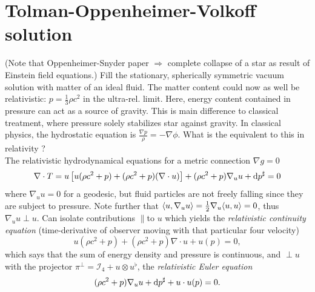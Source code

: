 \section{Tolman-Oppenheimer-Volkoff solution}
(Note that Oppenheimer-Snyder paper $\Rightarrow$ complete collapse of a star as result of Einstein field equations.)
Fill the stationary, spherically symmetric vacuum solution with matter of an ideal fluid. The matter content could now as well be relativistic: $p=\frac{1}{3} \rho c^2$ in the ultra-rel. limit. Here, energy content contained in pressure can act as a source of gravity. This is main difference to classical treatment, where pressure solely stabilizes star against gravity. In classical physics, the hydrostatic equation is $\frac{\nabla p}{\rho} = - \nabla \phi$. What is the equivalent to this in relativity ?
\\
The relativistic hydrodynamical equations for a metric connection $\nabla g=0$ 
\begin{equation}
\nabla \cdot T= u \left[u(\rho c^2 + p) + (\rho c^2+p) (\nabla \cdot u) \right] + (\rho c^2 + p) \nabla_u u+ \mathrm{d} p^{\sharp} = 0
\end{equation}
where $\nabla_u u=0$ for a geodesic, but fluid particles are not freely falling since they are subject to pressure. Note further that $\langle u, \nabla_u u\rangle = \frac{1}{2} \nabla_u \langle u,u \rangle =0$, thus $\nabla_u u \perp u$. Can isolate contributions $\parallel$to $u$ which yields the \emph{relativistic continuity equation} (time-derivative of observer moving with that particular four velocity)
\begin{equation}
u(\rho c^2 +p) + (\rho c^2+p) \nabla \cdot u + u(p) = 0,
\end{equation}	
which says that the sum of energy density and pressure is continuous, and $\perp u$ with the projector $\pi^{\perp} = \mathcal{I}_4 + u \otimes u^{\flat}$, the \emph{relativistic Euler equation}
\begin{equation}
(\rho c^2+p) \nabla_u u + \mathrm{d} p^{\sharp} + u \cdot u(p) = 0.
\end{equation}

